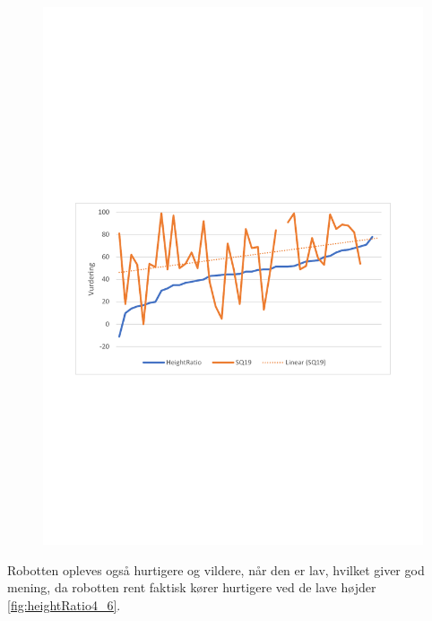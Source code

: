 \begin{figure}[H]
\centering
\includegraphics[width=\textwidth]{Figure/DatabehandlingSkalaer/Demografi/HeightRatio.pdf}
\caption{}
\label{fig:heightRatio19}
\end{figure}
\noindent

Robotten opleves også hurtigere og vildere, når den er lav, hvilket giver god mening, da robotten rent faktisk kører hurtigere ved de lave højder \autoref{fig:heightRatio4_6}.



